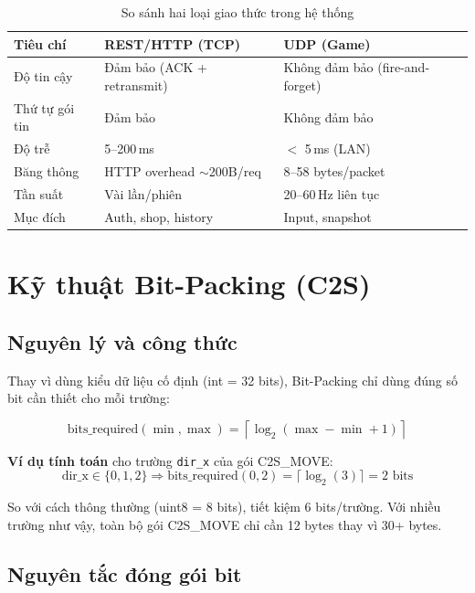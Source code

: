 \documentclass[12pt,a4paper]{report}
\begin{document}
\begin{table}[H]
\centering
\caption{So sánh hai loại giao thức trong hệ thống}
\label{tab:protocols}
\begin{tabularx}{\textwidth}{lXX}
\toprule
\textbf{Tiêu chí} & \textbf{REST/HTTP (TCP)} & \textbf{UDP (Game)} \\
\midrule
Độ tin cậy      & Đảm bảo (ACK + retransmit) & Không đảm bảo (fire-and-forget) \\
Thứ tự gói tin  & Đảm bảo                   & Không đảm bảo \\
Độ trễ          & 5--200\,ms                & $<$ 5\,ms (LAN) \\
Băng thông      & HTTP overhead $\sim$200B/req & 8--58 bytes/packet \\
Tần suất        & Vài lần/phiên              & 20--60\,Hz liên tục \\
Mục đích        & Auth, shop, history       & Input, snapshot \\
\bottomrule
\end{tabularx}
\end{table}

\section{Kỹ thuật Bit-Packing (C2S)}

\subsection{Nguyên lý và công thức}

Thay vì dùng kiểu dữ liệu cố định (int = 32 bits), Bit-Packing chỉ dùng đúng số bit cần thiết cho mỗi trường:

\begin{equation}
\text{bits\_required}(\min, \max) = \left\lceil \log_2(\max - \min + 1) \right\rceil
\label{eq:bitpacking}
\end{equation}

\textbf{Ví dụ tính toán} cho trường \texttt{dir\_x} của gói C2S\_MOVE:
\[
\text{dir\_x} \in \{0, 1, 2\} \Rightarrow \text{bits\_required}(0, 2) = \lceil\log_2(3)\rceil = 2 \text{ bits}
\]

So với cách thông thường (uint8 = 8 bits), tiết kiệm 6 bits/trường. Với nhiều trường như vậy, toàn bộ gói C2S\_MOVE chỉ cần 12 bytes thay vì 30+ bytes.

\subsection{Nguyên tắc đóng gói bit}
\end{document}
